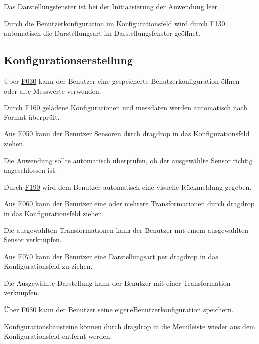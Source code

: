 \documentclass[parskip=full]{scrartcl}
\begin{document}
\begin{description}
\hypertarget{link-f140}{\item[F140]} Das Darstellungsfenster ist bei der Initialisierung der Anwendung leer.
\hypertarget{link-f150}{\item[F150]} Durch die \gls{Benutzerkonfiguration} im Konfigurationsfeld wird durch  \hyperlink{link-f130}{F130} automatisch die Darstellungsart im Darstellungsfenster geöffnet.
\end{description}



\subsection{Konfigurationserstellung}

\begin{description}

\hypertarget{link-f160}{\item[F160]} Über \hyperlink{link-f030}{F030} kann der Benutzer eine gespeicherte \gls{Benutzerkonfiguration} öffnen oder alte Messwerte verwenden.
\hypertarget{link-f170}{\item[F170]} Durch \hyperlink{link-f160}{F160} geladene Konfigurationen und \gls{messdaten} werden automatisch nach Format überprüft.
\hypertarget{link-f180}{\item[F180]} Aus \hyperlink{link-f050}{F050} kann der Benutzer Sensoren durch \gls{dragdrop} in das Konfigurationsfeld ziehen.
\hypertarget{link-f190}{\item[F190]} Die Anwendung sollte automatisch überprüfen, ob der ausgewählte Sensor richtig angeschlossen ist.
\hypertarget{link-f200]}{\item[F200]} Durch \hyperlink{link-f190}{F190} wird dem Benutzer automatisch eine visuelle Rückmeldung gegeben.
\hypertarget{link-f210}{\item[F210]} Aus \hyperlink{link-f060}{F060} kann der Benutzer eine oder mehrere Transformationen durch \gls{dragdrop} in das Konfigurationsfeld ziehen.
\hypertarget{link-f220}{\item[F220]} Die ausgewählten Transformationen kann der Benutzer mit einem ausgewählten Sensor verknüpfen.
\hypertarget{link-f230}{\item[F230]} Aus \hyperlink{link-f070}{F070} kann der Benutzer eine Darstellungsart per \gls{dragdrop} in das Konfigurationsfeld zu ziehen.
\hypertarget{link-f240}{\item[F240]} Die Ausgewählte Darstellung kann der Benutzer mit einer Transformation verknüpfen.
\hypertarget{link-f250}{\item[F250]} Über \hyperlink{link-f030}{F030} kann der Benutzer seine eigene\gls{Benutzerkonfiguration} speichern.
\hypertarget{link-f260}{\item[F260]} Konfigurationsbausteine können durch \gls{dragdrop} in die Menüleiste wieder aus dem Konfigurationsfeld entfernt werden.

\end{description}
\end{document}
